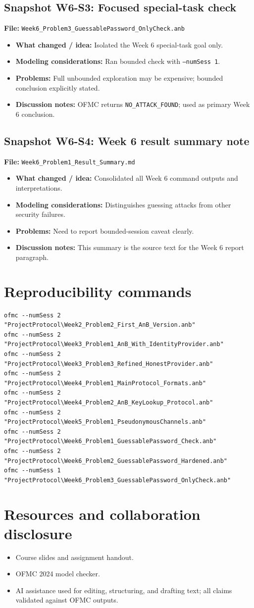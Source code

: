 \documentclass[11pt,a4paper]{article}
\begin{document}
\subsection*{Snapshot W6-S3: Focused special-task check}
\textbf{File:} \texttt{Week6\_Problem3\_GuessablePassword\_OnlyCheck.anb}
\begin{itemize}[leftmargin=1.2em]
  \item \textbf{What changed / idea:} Isolated the Week 6 special-task goal only.
  \item \textbf{Modeling considerations:} Ran bounded check with \texttt{--numSess 1}.
  \item \textbf{Problems:} Full unbounded exploration may be expensive; bounded conclusion explicitly stated.
  \item \textbf{Discussion notes:} OFMC returns \texttt{NO\_ATTACK\_FOUND}; used as primary Week 6 conclusion.
\end{itemize}

\subsection*{Snapshot W6-S4: Week 6 result summary note}
\textbf{File:} \texttt{Week6\_Problem1\_Result\_Summary.md}
\begin{itemize}[leftmargin=1.2em]
  \item \textbf{What changed / idea:} Consolidated all Week 6 command outputs and interpretations.
  \item \textbf{Modeling considerations:} Distinguishes guessing attacks from other security failures.
  \item \textbf{Problems:} Need to report bounded-session caveat clearly.
  \item \textbf{Discussion notes:} This summary is the source text for the Week 6 report paragraph.
\end{itemize}

\section*{Reproducibility commands}
\begin{lstlisting}
ofmc --numSess 2 "ProjectProtocol\Week2_Problem2_First_AnB_Version.anb"
ofmc --numSess 2 "ProjectProtocol\Week3_Problem1_AnB_With_IdentityProvider.anb"
ofmc --numSess 2 "ProjectProtocol\Week3_Problem3_Refined_HonestProvider.anb"
ofmc --numSess 2 "ProjectProtocol\Week4_Problem1_MainProtocol_Formats.anb"
ofmc --numSess 2 "ProjectProtocol\Week4_Problem2_AnB_KeyLookup_Protocol.anb"
ofmc --numSess 2 "ProjectProtocol\Week5_Problem1_PseudonymousChannels.anb"
ofmc --numSess 2 "ProjectProtocol\Week6_Problem1_GuessablePassword_Check.anb"
ofmc --numSess 2 "ProjectProtocol\Week6_Problem2_GuessablePassword_Hardened.anb"
ofmc --numSess 1 "ProjectProtocol\Week6_Problem3_GuessablePassword_OnlyCheck.anb"
\end{lstlisting}

\section*{Resources and collaboration disclosure}
\begin{itemize}[leftmargin=1.2em]
  \item Course slides and assignment handout.
  \item OFMC 2024 model checker.
  \item AI assistance used for editing, structuring, and drafting text; all claims validated against OFMC outputs.
\end{itemize}
\end{document}
